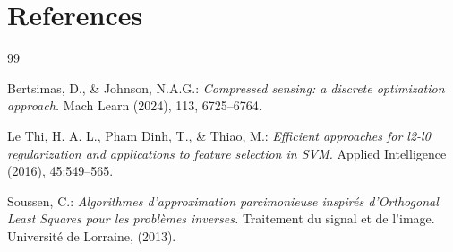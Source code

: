 \documentclass[fleqn]{report} %
\begin{document}
\section*{References}
\begin{thebibliography}{99} %

Bertsimas, D., \& Johnson, N.A.G.:  \textit{Compressed sensing: a discrete optimization approach.} Mach Learn  (2024), 113, 6725–6764.

Le Thi, H. A. L., Pham Dinh, T., \& Thiao, M.: \textit{Efficient approaches for l2-l0 regularization
and applications to feature selection in SVM.} Applied Intelligence (2016), 45:549–565.

Soussen, C.: \textit{Algorithmes d'approximation parcimonieuse inspir\'es  d'Orthogonal Least Squares pour les probl\`emes inverses.} Traitement du signal et de l'image. Université de Lorraine, (2013).
\end{thebibliography}
\end{document}
